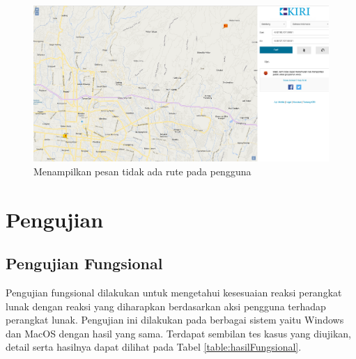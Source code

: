 \begin{figure}[H]
	\centering
	\includegraphics[scale=0.3]{Gambar/KIRI-notfound}
	\caption{Menampilkan pesan tidak ada rute pada pengguna} 
	\label{fig:5_KIRI_not_found}
\end{figure}

\section{Pengujian}
\subsection{Pengujian Fungsional}

Pengujian fungsional dilakukan untuk mengetahui kesesuaian reaksi perangkat lunak dengan reaksi yang diharapkan berdasarkan aksi pengguna terhadap perangkat lunak. Pengujian ini dilakukan pada berbagai sistem yaitu Windows dan MacOS dengan hasil yang sama. Terdapat sembilan tes kasus yang diujikan, detail serta hasilnya dapat dilihat pada Tabel \ref{table:hasilFungsional}.
			
